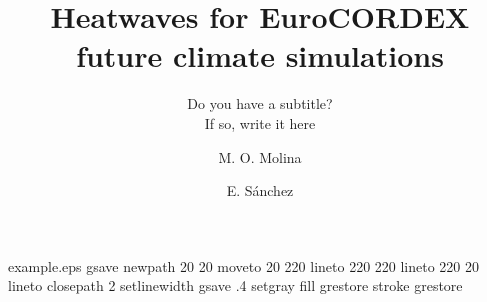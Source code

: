 %
%
%
%
%
\begin{filecontents*}{example.eps}
gsave
newpath
  20 20 moveto
  20 220 lineto
  220 220 lineto
  220 20 lineto
closepath
2 setlinewidth
gsave
  .4 setgray fill
grestore
stroke
grestore
\end{filecontents*}
%
\RequirePackage{fix-cm}
%
\documentclass[smallextended]{svjour3}       %
%
\smartqed  %
%
\usepackage{graphicx}
\usepackage{natbib}
%
%
%
%
%


\title{Heatwaves for EuroCORDEX future climate simulations
}
\subtitle{Do you have a subtitle?\\ If so, write it here}


\author{M. O. Molina         \and
        E. Sánchez %
}



